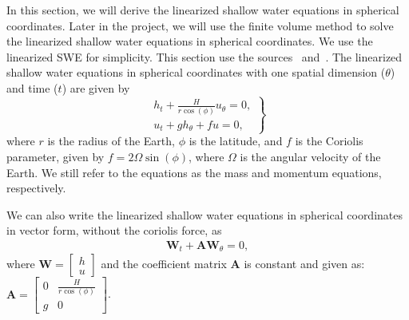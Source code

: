In this section, we will derive the linearized shallow water equations in spherical coordinates.
Later in the project, we will use the finite volume method to solve the linearized shallow water equations in spherical coordinates.
We use the linearized SWE for simplicity.
This section use the sources~\cite{BONEV_2018} and~\cite{Eskilsson_2005}.
The linearized shallow water equations in spherical coordinates with one spatial dimension ($\theta$) and time ($t$) are given by
\begin{equation}\label{eq:linearized_swe_spherical}
    \left.
    \begin{aligned}
        h_t + \frac{H}{r \cos(\phi)} u_\theta = 0, \\
        u_t + g h_\theta + fu = 0,
    \end{aligned}
    \right\}
\end{equation}
where $r$ is the radius of the Earth, $\phi$ is the latitude, and $f$ is the Coriolis parameter, given by $f = 2 \Omega \sin(\phi)$, where $\Omega$ is the angular velocity of the Earth.
We still refer to the equations as the mass and momentum equations, respectively.



We can also write the linearized shallow water equations in spherical coordinates in vector form, without the coriolis force, as
\begin{align}\label{eq:linearized_swe_spherical_vector}
    \mathbf{W}_t + \mathbf{A} \mathbf{W}_\theta = 0,
\end{align}
where $\mathbf{W} =
\begin{bmatrix} h \\ u \end{bmatrix}$ and the coefficient matrix $\mathbf{A}$ is constant and given as:
$\mathbf{A} = \begin{bmatrix} 0 & \frac{H}{r \cos(\phi)} \\ g & 0 \end{bmatrix}$.



